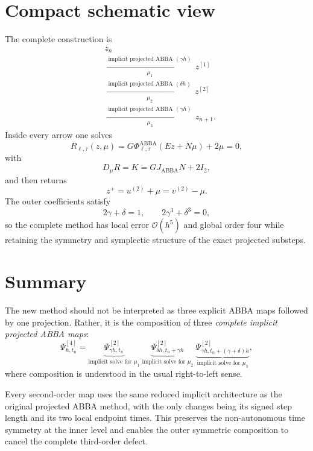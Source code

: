 \documentclass[11pt,a4paper]{article}
\newcommand{\OO}{\mathcal{O}}
\newcommand{\ABBA}{\operatorname{ABBA}}
\newcommand{\Id}{I_2}
\newcommand{\PhiA}{\Phi^{\mathrm{ABBA}}}
\newcommand{\Psitwo}{\Psi^{[2]}}
\newcommand{\Psifour}{\Psi^{[4]}}
\begin{document}
\section{Compact schematic view}
The complete construction is
\begin{equation}
\boxed{
\begin{aligned}
&z_n
\\[-1mm]
&\xrightarrow[\mu_1]{\ \text{implicit projected ABBA }(\gamma h)\ }
 z^{[1]}
\\[-1mm]
&\xrightarrow[\mu_2]{\ \text{implicit projected ABBA }(\delta h)\ }
 z^{[2]}
\\[-1mm]
&\xrightarrow[\mu_3]{\ \text{implicit projected ABBA }(\gamma h)\ }
 z_{n+1}.
\end{aligned}}
\end{equation}
Inside every arrow one solves
\begin{equation}
    R_{\ell,\tau}(z,\mu)
    =G\PhiA_{\ell,\tau}(Ez+N\mu)+2\mu=0,
\end{equation}
with
\begin{equation}
    D_\mu R=K
    =GJ_{\ABBA}N+2\Id,
\end{equation}
and then returns
\begin{equation}
    z^+=u^{(2)}+\mu=v^{(2)}-\mu.
\end{equation}
The outer coefficients satisfy
\begin{equation}
    2\gamma+\delta=1,
    \qquad
    2\gamma^3+\delta^3=0,
\end{equation}
so the complete method has local error $\OO(h^5)$ and global order four while retaining the symmetry and symplectic structure of the exact projected substeps.

\section{Summary}
The new method should not be interpreted as three explicit ABBA maps followed by one projection. Rather, it is the composition of three \emph{complete implicit projected ABBA maps}:
\begin{equation}
    \boxed{
    \Psifour_{h,t_n}
    =
    \underbrace{\Psitwo_{\gamma h,t_n}}_{\text{implicit solve for }\mu_1}
    \;\underbrace{\Psitwo_{\delta h,t_n+\gamma h}}_{\text{implicit solve for }\mu_2}
    \;\underbrace{\Psitwo_{\gamma h,t_n+(\gamma+\delta)h}}_{\text{implicit solve for }\mu_3},
    }
\end{equation}
where composition is understood in the usual right-to-left sense.

Every second-order map uses the same reduced implicit architecture as the original projected ABBA method, with the only changes being its signed step length and its two local endpoint times. This preserves the non-autonomous time symmetry at the inner level and enables the outer symmetric composition to cancel the complete third-order defect.
\end{document}
